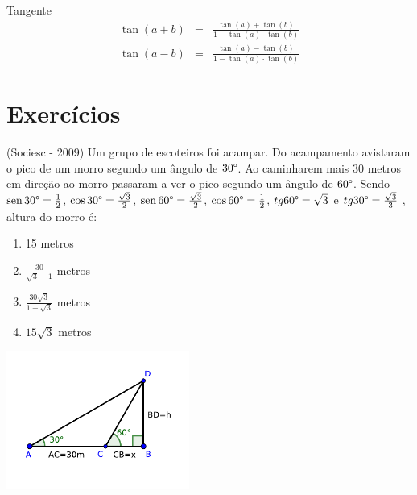  Tangente
 \begin{eqnarray*}
  \tan(a+b)&=& \frac{\tan(a)+\tan(b)}{1-\tan(a)\cdot \tan(b)} \\
  \tan(a-b)&=& \frac{\tan(a)-\tan(b)}{1-\tan(a)\cdot \tan(b)}
 \end{eqnarray*}
 
 \section{Exercícios}
 \begin{exer}
 (Sociesc - 2009) Um grupo de escoteiros foi acampar. Do acampamento avistaram o pico de um morro segundo um ângulo de $30 \degree$. Ao caminharem mais 30 metros em direção ao morro passaram a ver o pico segundo um ângulo de $60 \degree$. Sendo $\operatorname{sen} 30\degree = \frac{1}{2}$, $\cos 30\degree =\frac{\sqrt{3}}{2}$, $\operatorname{sen} 60\degree =\frac{\sqrt{3}}{2}$, $\cos 60\degree =\frac{1}{2}$, $tg 60\degree = \sqrt{3}$ e $tg 30\degree =\frac{\sqrt{3}}{3}$ , altura do morro é:
 \begin{multicols}{2}

 \begin{enumerate}
  \item 15 metros
  \item $\frac{30}{\sqrt{3}-1}$ metros
  \item $\frac{30\sqrt{3}}{1-\sqrt{3}}$ metros
  \item $15\sqrt{3}$ metros
 \end{enumerate}

 \includegraphics[width=6cm]{./cap_trigon/figs/tri_ret_exer}

 \end{multicols}
 \end{exer}
 
